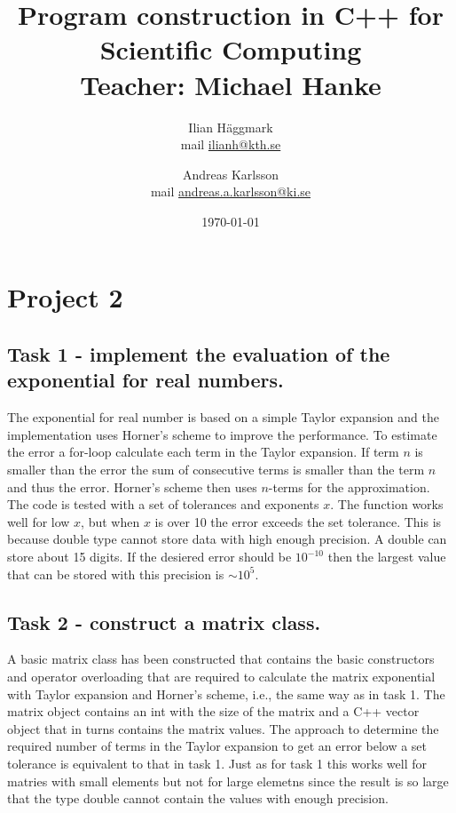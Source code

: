 \documentclass[paper=a4, fontsize=11pt]{article} %
\title{Program construction in C++ for Scientific Computing \\ Teacher: Michael Hanke}
\author{Ilian H{\"a}ggmark \\ mail \href{mailto:ilianh@kth.se}{ilianh@kth.se}
  \and Andreas Karlsson \\ mail \href{mailto:andreas.a.karlsson@ki.se}{andreas.a.karlsson@ki.se} }
\date{\normalsize\today} %
\begin{document}
\maketitle %

\section{Project 2}
\subsection{Task 1 - implement the evaluation of the exponential for real numbers.}

The exponential for real number is based on a simple Taylor expansion and the implementation uses Horner’s scheme to improve the performance.
To estimate the error a for-loop calculate each term in the Taylor expansion. If term $n$ is smaller than the error the sum of consecutive terms is smaller than the term $n$ and thus the error. Horner’s scheme then uses $n$-terms for the approximation.
The code is tested with a set of tolerances and exponents $x$. The function works well for low $x$, but when $x$ is over 10 the error exceeds the set tolerance. This is because double type cannot store data with high enough precision. A double can store about 15 digits. If the desiered error should be $10^{-10}$ then the largest value that can be stored with this precision is $\sim 10^{5}$.


\subsection{Task 2 - construct a matrix class.}

A basic matrix class has been constructed that contains the basic constructors and operator overloading that are required to calculate the matrix exponential with Taylor expansion and Horner's scheme, i.e., the same way as in task 1. The matrix object contains an int with the size of the matrix and a C++ vector object that in turns contains the matrix values. The approach to determine the required number of terms in the Taylor expansion to get an error below a set tolerance is equivalent to that in task 1. Just as for task 1 this works well for matries with small elements but not for large elemetns since the result is so large that the type double cannot contain the values with enough precision.
\end{document}
